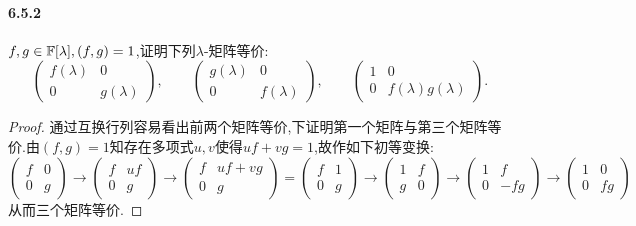 \documentclass[11pt]{article}
\begin{document}
\paragraph{6.5.2}$f,g\in \mathbb{F}[\lambda], (f,g)=1$,证明下列$\lambda$-矩阵等价:
$$\begin{pmatrix}
    f(\lambda) & 0 \\ 0 & g(\lambda)
\end{pmatrix},\qquad \begin{pmatrix}
    g(\lambda) & 0 \\ 0 & f(\lambda)
\end{pmatrix},\qquad \begin{pmatrix}
    1 & 0 \\ 0 & f(\lambda)g(\lambda)
\end{pmatrix}.$$
\begin{proof}
    通过互换行列容易看出前两个矩阵等价,下证明第一个矩阵与第三个矩阵等价.由$(f,g)=1$知存在多项式$u,v$使得$uf+vg=1$,故作如下初等变换:
    $$\begin{pmatrix}
        f & 0\\ 0 & g
    \end{pmatrix}\longrightarrow \begin{pmatrix}
        f & uf\\ 0 & g
    \end{pmatrix}\longrightarrow \begin{pmatrix}
        f & uf+vg\\ 0 & g
    \end{pmatrix}= \begin{pmatrix}
        f & 1\\ 0 & g
    \end{pmatrix}\longrightarrow \begin{pmatrix}
        1 & f\\ g & 0
    \end{pmatrix}\longrightarrow \begin{pmatrix}
        1 & f\\ 0 & -fg
    \end{pmatrix}\longrightarrow \begin{pmatrix}
        1 & 0\\ 0 & fg
    \end{pmatrix}$$
    从而三个矩阵等价.
\end{proof}
\end{document}
